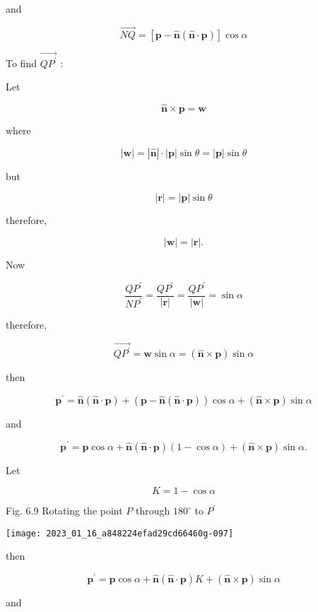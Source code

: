 and

$$
\overrightarrow{N Q}=[\mathbf{p}-\hat{\mathbf{n}}(\hat{\mathbf{n}} \cdot \mathbf{p})] \cos \alpha
$$

To find $\overrightarrow{Q P^{\prime}}$ :

Let

$$
\hat{\mathbf{n}} \times \mathbf{p}=\mathbf{w}
$$

where

$$
|\mathbf{w}|=|\hat{\mathbf{n}}| \cdot|\mathbf{p}| \sin \theta=|\mathbf{p}| \sin \theta
$$

but

$$
|\mathbf{r}|=|\mathbf{p}| \sin \theta
$$

therefore,

$$
|\mathbf{w}|=|\mathbf{r}| .
$$

Now

$$
\frac{Q P^{\prime}}{N P^{\prime}}=\frac{Q P^{\prime}}{|\mathbf{r}|}=\frac{Q P^{\prime}}{|\mathbf{w}|}=\sin \alpha
$$

therefore,

$$
\overrightarrow{Q P^{\prime}}=\mathbf{w} \sin \alpha=(\hat{\mathbf{n}} \times \mathbf{p}) \sin \alpha
$$

then

$$
\mathbf{p}^{\prime}=\hat{\mathbf{n}}(\hat{\mathbf{n}} \cdot \mathbf{p})+(\mathbf{p}-\hat{\mathbf{n}}(\hat{\mathbf{n}} \cdot \mathbf{p})) \cos \alpha+(\hat{\mathbf{n}} \times \mathbf{p}) \sin \alpha
$$

and

$$
\mathbf{p}^{\prime}=\mathbf{p} \cos \alpha+\hat{\mathbf{n}}(\hat{\mathbf{n}} \cdot \mathbf{p})(1-\cos \alpha)+(\hat{\mathbf{n}} \times \mathbf{p}) \sin \alpha .
$$

Let

$$
K=1-\cos \alpha
$$

Fig. 6.9 Rotating the point $P$ through $180^{\circ}$ to $P^{\prime}$

\begin{center}
\texttt{[image: 2023\_01\_16\_a848224efad29cd66460g-097]}
\end{center}

then

$$
\mathbf{p}^{\prime}=\mathbf{p} \cos \alpha+\hat{\mathbf{n}}(\hat{\mathbf{n}} \cdot \mathbf{p}) K+(\hat{\mathbf{n}} \times \mathbf{p}) \sin \alpha
$$

and


